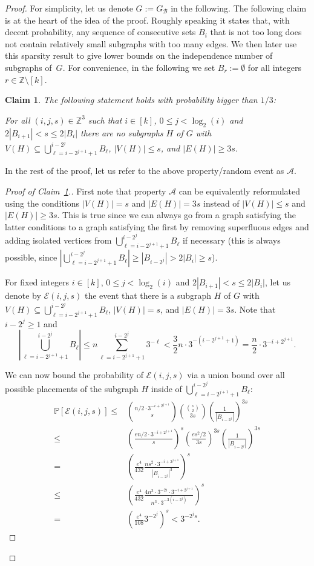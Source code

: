 \documentclass[a4paper,10pt]{amsart}
\newtheorem{claim}[theorem]{Claim}
\begin{document}
\begin{proof}
For simplicity, let us denote $G:=G_{\mathcal{B}}$ in the following. 
The following claim is at the heart of the idea of the proof. Roughly speaking it states that, with decent probability, any sequence of consecutive sets $B_i$ that is not too long does not contain relatively small subgraphs with too many edges. We then later use this sparsity result to give lower bounds on the independence number of subgraphs of~$G$. For convenience, in the following we set $B_r:=\emptyset$ for all integers $r\in \mathbb{Z}\setminus [k]$.
\begin{claim}\label{cl1} The following statement holds with probability bigger than $1/3$:

For all $(i,j,s)\in \mathbb{Z}^3$ such that $i\in [k]$, $0\le j<\log_2(i)$ and $2|B_{i+1}|<s\le 2|B_{i}|$ there are no subgraphs $H$ of $G$ with $V(H)\subseteq \bigcup_{\ell=i-2^{j+1}+1}^{i-2^j}{B_\ell}$, $|V(H)|\le s$, and $|E(H)|\ge 3s$. \end{claim}
In the rest of the proof, let us refer to the above property/random event as $\mathcal{A}$.
\begin{proof}[Proof of Claim~\ref{cl1}.]
First note that property $\mathcal{A}$ can be equivalently reformulated using the conditions $|V(H)|=s$ and $|E(H)|=3s$ instead of $|V(H)|\le s$ and $|E(H)|\ge 3s$. This is true since we can always go from a graph satisfying the latter conditions to a graph satisfying the first by removing superfluous edges and adding isolated vertices from $\bigcup_{\ell=i-2^{j+1}+1}^{i-2^j}{B_\ell}$ if necessary (this is always possible, since $\left|\bigcup_{\ell=i-2^{j+1}+1}^{i-2^j}{B_\ell}\right|\ge |B_{i-2^j}|>2|B_{i}|\ge s$). 

    For fixed integers $i\in [k]$, $0\le j<\log_2(i)$ and  $2|B_{i+1}|<s\le 2|B_i|$, let us denote by $\mathcal{E}(i,j,s)$ the event that there is a subgraph $H$ of $G$ with $V(H)\subseteq \bigcup_{\ell=i-2^{j+1}+1}^{i-2^j}{B_\ell}$, $|V(H)|=s$, and $|E(H)|=3s$. Note that $i-2^j\ge 1$ and $$\left| \bigcup_{\ell=i-2^{j+1}+1}^{i-2^j}{B_\ell}\right|\le n\sum_{\ell=i-2^{j+1}+1}^{i-2^j}{3^{-\ell}}<\frac{3}{2}n\cdot 3^{-(i-2^{j+1}+1)}=\frac{n}{2}\cdot 3^{-i+2^{j+1}}.$$
    
    We can now bound the probability of $\mathcal{E}(i,j,s)$ via a union bound over all possible placements of the subgraph $H$ inside of $\bigcup_{\ell=i-2^{j+1}+1}^{i-2^j}{B_\ell}$:
    \begin{align*}\mathbb{P}[\mathcal{E}(i,j,s)]\le & \binom{n/2\cdot 3^{-i+2^{j+1}}}{s} \binom{\binom{s}{2}}{3s}\left(\frac{1}{|B_{i-2^{j}}|}\right)^{3s} \\
    \le &\left(\frac{en/2\cdot 3^{-i+2^{j+1}}}{s}\right)^s \left(\frac{es^2/2}{3s}\right)^{3s} \left(\frac{1}{|B_{i-2^{j}}|}\right)^{3s} \\
    = &\left(\frac{e^4}{432}\frac{ns^2\cdot 3^{-i+2^{j+1}}}{|B_{i-2^j}|^3}\right)^s \\
    \le &\left(\frac{e^4}{432}\frac{4n^3\cdot 3^{-2i}\cdot 3^{-i+2^{j+1}}}{n^3\cdot 3^{-3(i-2^j)}}\right)^s\\
    =& \left(\frac{e^4}{108}3^{-2^j}\right)^s<3^{-2^js}.
\end{align*}


\end{proof}
\end{proof}
\end{document}
